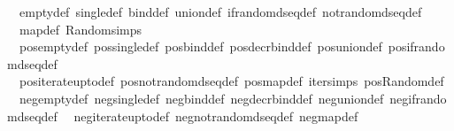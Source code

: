 \begin{isabellebody}
\isanewline
{}\isamarkupfalse%
\ {\isacharparenleft}{\kern0pt}\ empty{\isacharunderscore}{\kern0pt}def\ single{\isacharunderscore}{\kern0pt}def\ bind{\isacharunderscore}{\kern0pt}def\ union{\isacharunderscore}{\kern0pt}def\ if{\isacharunderscore}{\kern0pt}random{\isacharunderscore}{\kern0pt}dseq{\isacharunderscore}{\kern0pt}def\ not{\isacharunderscore}{\kern0pt}random{\isacharunderscore}{\kern0pt}dseq{\isacharunderscore}{\kern0pt}def\isanewline
\ \ map{\isacharunderscore}{\kern0pt}def\ Random{\isachardot}{\kern0pt}simps\isanewline
\ \ pos{\isacharunderscore}{\kern0pt}empty{\isacharunderscore}{\kern0pt}def\ pos{\isacharunderscore}{\kern0pt}single{\isacharunderscore}{\kern0pt}def\ pos{\isacharunderscore}{\kern0pt}bind{\isacharunderscore}{\kern0pt}def\ pos{\isacharunderscore}{\kern0pt}decr{\isacharunderscore}{\kern0pt}bind{\isacharunderscore}{\kern0pt}def\ pos{\isacharunderscore}{\kern0pt}union{\isacharunderscore}{\kern0pt}def\ pos{\isacharunderscore}{\kern0pt}if{\isacharunderscore}{\kern0pt}random{\isacharunderscore}{\kern0pt}dseq{\isacharunderscore}{\kern0pt}def\isanewline
\ \ pos{\isacharunderscore}{\kern0pt}iterate{\isacharunderscore}{\kern0pt}upto{\isacharunderscore}{\kern0pt}def\ pos{\isacharunderscore}{\kern0pt}not{\isacharunderscore}{\kern0pt}random{\isacharunderscore}{\kern0pt}dseq{\isacharunderscore}{\kern0pt}def\ pos{\isacharunderscore}{\kern0pt}map{\isacharunderscore}{\kern0pt}def\ iter{\isachardot}{\kern0pt}simps\ pos{\isacharunderscore}{\kern0pt}Random{\isacharunderscore}{\kern0pt}def\isanewline
\ \ neg{\isacharunderscore}{\kern0pt}empty{\isacharunderscore}{\kern0pt}def\ neg{\isacharunderscore}{\kern0pt}single{\isacharunderscore}{\kern0pt}def\ neg{\isacharunderscore}{\kern0pt}bind{\isacharunderscore}{\kern0pt}def\ neg{\isacharunderscore}{\kern0pt}decr{\isacharunderscore}{\kern0pt}bind{\isacharunderscore}{\kern0pt}def\ neg{\isacharunderscore}{\kern0pt}union{\isacharunderscore}{\kern0pt}def\ neg{\isacharunderscore}{\kern0pt}if{\isacharunderscore}{\kern0pt}random{\isacharunderscore}{\kern0pt}dseq{\isacharunderscore}{\kern0pt}def\isanewline
\ \ neg{\isacharunderscore}{\kern0pt}iterate{\isacharunderscore}{\kern0pt}upto{\isacharunderscore}{\kern0pt}def\ neg{\isacharunderscore}{\kern0pt}not{\isacharunderscore}{\kern0pt}random{\isacharunderscore}{\kern0pt}dseq{\isacharunderscore}{\kern0pt}def\ neg{\isacharunderscore}{\kern0pt}map{\isacharunderscore}{\kern0pt}def\isanewline
%
\isadelimtheory
\isanewline
%
\endisadelimtheory
%
\isatagtheory
{}\isamarkupfalse%
%
\endisatagtheory
{\isafoldtheory}%
%
\isadelimtheory
%
\endisadelimtheory
%
\end{isabellebody}%
